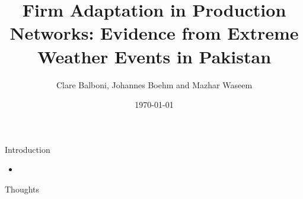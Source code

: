 \documentclass{beamer}
\begin{document}
\title{Firm Adaptation in Production Networks: Evidence from Extreme Weather Events in Pakistan}
\author{Clare Balboni, Johannes Boehm and Mazhar Waseem}

\date{\today}

\frame{\titlepage}

\begin{frame}{Introduction}
\begin{itemize}
    \item 
    
\end{itemize}

\end{frame}

\begin{frame}[allowframebreaks]{Thoughts}
\begin{itemize}
    

\end{itemize}
\end{frame}
\end{document}
